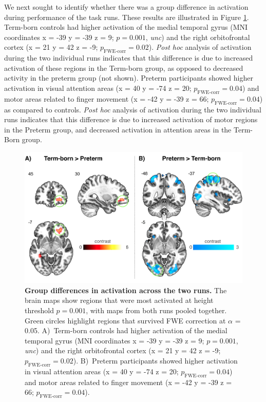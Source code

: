 We next sought to identify whether there was a group difference in activation during performance of the task runs. These results are illustrated in Figure  \ref{fig:GroupActivation}. Term-born controls had higher activation of the medial temporal gyrus (MNI coordinates x = -39 y = -39 z = 9; $p = 0.001$, \textit{unc}) and the right orbitofrontal cortex (x = 21 y = 42 z = -9; $p_{\text{FWE-corr}} = 0.02$). \textit{Post hoc} analysis of activation during the two individual runs indicates that this difference is due to increased activation of these regions in the Term-born group, as opposed to decreased activity in the preterm group (not shown). Preterm participants showed higher activation in visual attention areas (x = 40 y = -74 z = 20; $p_{\text{FWE-corr}} = 0.04$) and motor areas related to finger movement (x = -42 y = -39  z = 66; $p_{\text{FWE-corr}} = 0.04$) as compared to controls. \textit{Post hoc} analysis of activation during the two individual runs indicates that this difference is due to increased activation of motor regions in the Preterm group, and decreased activation in attention areas in the Term-Born group.


\begin{figure}[h]
\vspace{3mm}
\centering\includegraphics[width=1\linewidth]{images/Ch4/Ch4_CtrlVsPre_ctrl_pre.png}
\caption{\textbf{Group differences in activation across the two runs.} The brain maps show regions that were most activated at height threshold $p = 0.001$, with maps from both runs pooled together. Green circles highlight regions that survived FWE correction at $\alpha$ = 0.05. A)~Term-born controls had higher activation of the medial temporal gyrus (MNI coordinates x = -39 y = -39 z = 9; $p = 0.001$, \textit{unc}) and the right orbitofrontal cortex (x = 21 y = 42 z = -9; $p_{\text{FWE-corr}} = 0.02$). B)~Preterm participants showed higher activation in visual attention areas (x = 40 y = -74 z = 20; $p_{\text{FWE-corr}} = 0.04$) and motor areas related to finger movement (x = -42 y = -39  z = 66; $p_{\text{FWE-corr}} = 0.04$).} \label{fig:GroupActivation}
\end{figure} 


